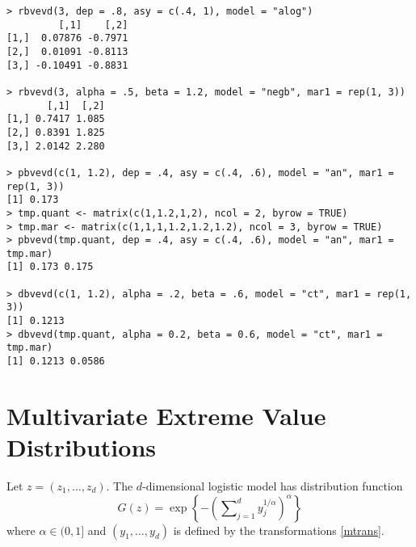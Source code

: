 \documentclass[11pt,a4paper]{article}
\begin{document}
\begin{verbatim}
> rbvevd(3, dep = .8, asy = c(.4, 1), model = "alog")
         [,1]    [,2]
[1,]  0.07876 -0.7971
[2,]  0.01091 -0.8113
[3,] -0.10491 -0.8831

> rbvevd(3, alpha = .5, beta = 1.2, model = "negb", mar1 = rep(1, 3))
       [,1]  [,2]
[1,] 0.7417 1.085
[2,] 0.8391 1.825
[3,] 2.0142 2.280

> pbvevd(c(1, 1.2), dep = .4, asy = c(.4, .6), model = "an", mar1 = rep(1, 3))
[1] 0.173
> tmp.quant <- matrix(c(1,1.2,1,2), ncol = 2, byrow = TRUE)
> tmp.mar <- matrix(c(1,1,1,1.2,1.2,1.2), ncol = 3, byrow = TRUE)
> pbvevd(tmp.quant, dep = .4, asy = c(.4, .6), model = "an", mar1 = tmp.mar)
[1] 0.173 0.175

> dbvevd(c(1, 1.2), alpha = .2, beta = .6, model = "ct", mar1 = rep(1, 3))
[1] 0.1213
> dbvevd(tmp.quant, alpha = 0.2, beta = 0.6, model = "ct", mar1 = tmp.mar)
[1] 0.1213 0.0586
\end{verbatim}


\section{Multivariate Extreme Value Distributions}
\setcounter{footnote}{0}
\label{mult}

Let $z=(z_1,\dots,z_d)$.
The $d$-dimensional logistic model \citep{gumb60b} has distribution function
\begin{equation*}
G(z) = \exp\left\{-\left(\sum\nolimits_{j=1}^d y_j^{1/\alpha}\right)^\alpha\right\}
\end{equation*} 
where $\alpha\in(0,1]$ and $(y_1,\dots,y_d)$ is defined by the transformations \eqref{mtrans}.
\end{document}
